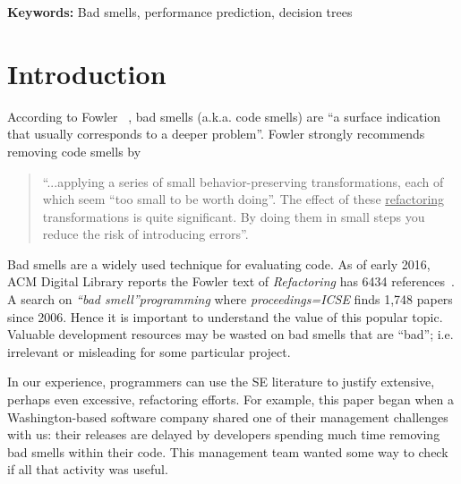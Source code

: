 \documentclass[twocolumn,5p]{elsarticle}
\theoremstyle{break}
\begin{document}
\vspace{1mm}
\noindent
{\bf Keywords:} Bad smells,
performance prediction,  decision trees 




\section{Introduction}

\noindent

According to   Fowler ~\cite{fowler99}, bad smells (a.k.a. code smells)
are ``a surface indication that usually corresponds to a deeper problem''.
Fowler strongly recommends   removing   code smells   by
\begin{quote}
``...applying a series of small behavior-preserving transformations, each 
of which seem ``too small to be worth doing''. 
The  effect of   these \underline{refactoring} transformations is quite significant. By doing them in small steps you reduce the risk 
of introducing errors''.
\end{quote}
Bad smells are a widely used technique for evaluating code. As of  early 2016, ACM Digital Library reports 
the Fowler text of {\em Refactoring} has 6434 references~\cite{fowler99}. A search  on {\em ``bad smell''programming} 
where {\em proceedings=ICSE} finds 1,748 papers since 2006.
Hence it is important to understand the value of
this popular topic.  
Valuable development resources may be wasted on bad smells that are ``bad''; i.e. 
 irrelevant or misleading
for some particular project.

In our experience, programmers can use the SE literature to justify extensive, perhaps even excessive, refactoring efforts.
For example, this paper began when a Washington-based software company shared
one of their management challenges with us: their  releases are delayed by developers spending  much time removing bad smells within their code. This management team wanted some way to check if all that activity was useful.
 
\end{document}
